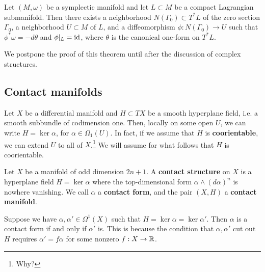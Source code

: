 \documentclass{amsart}
\begin{document}
\begin{theorem}
    Let $(M,\omega)$ be a symplectic manifold and let $L\subset M$ be a compact
    Lagrangian submanifold. Then there exists a neighborhood $N(\Gamma_0)\subset T^*L$
    of the zero section $\Gamma_0$, a neighborhood $U\subset M$ of $L$, and a
    diffeomorphism $\phi:N(\Gamma_0)\to U$ such that $\phi^*\omega=-d\theta$ and
    $\phi|_L=\operatorname{id}$, where $\theta$ is the canonical one-form on $T^*L$.
    \label{thm:lnt}
\end{theorem}
We postpone the proof of this theorem until after the discussion of complex structures.

\subsection{Contact manifolds}

Let $X$ be a differential manifold and $H\subset TX$ be a smooth hyperplane field,
i.e. a smooth subbundle of codimension one.
Then, locally on some open $U$, we can write $H=\ker\alpha$,
for $\alpha\in\Omega_1(U)$. In fact, if we assume that $H$ is \textbf{coorientable},
we can extend $U$ to all of $X$.\footnote{Why?} We will assume for what
follows that $H$ is coorientable.

\begin{definition}
    Let $X$ be a manifold of odd dimension $2n+1$. A \textbf{contact structure}
    on $X$ is a hyperplane field $H=\ker\alpha$ where the top-dimensional form
    $\alpha\wedge(d\alpha)^n$ is nowhere vanishing. We call $\alpha$ a
    \textbf{contact form}, and the pair $(X,H)$ a \textbf{contact manifold}.
\end{definition}

\begin{remark}
    Suppose we have $\alpha,\alpha'\in\Omega^1(X)$ such that $H=\ker\alpha=\ker\alpha'$.
    Then $\alpha$ is a contact form if and only if $\alpha'$ is. This is because
    the condition that $\alpha,\alpha'$ cut out $H$ requires $\alpha'=f\alpha$ for some
    nonzero $f:X\to\mathbb{R}$.
\end{remark}
\end{document}
